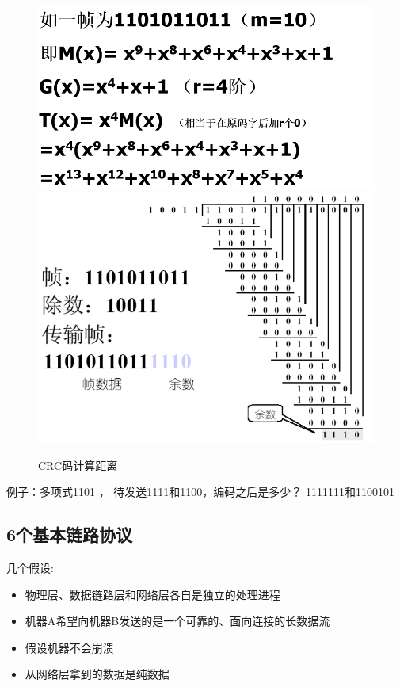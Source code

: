 \documentclass[UTF8,a4paper]{ctexart}
\begin{document}
  \begin{figure}[H]
    \centering
    \includegraphics[scale = 0.3]{assets/jisuanjiwangluo_64318.png}
    \includegraphics[scale = 0.3]{assets/jisuanjiwangluo_05982.png}
    \caption{CRC码计算距离}
  \end{figure}

  例子：多项式1101 ， 待发送1111和1100，编码之后是多少？
  1111111和1100101

  \subsection{6个基本链路协议}
  几个假设:
  \begin{itemize}
    \item 物理层、数据链路层和网络层各自是独立的处理进程
    \item 机器A希望向机器B发送的是一个可靠的、面向连接的长数据流
    \item 假设机器不会崩溃
    \item 从网络层拿到的数据是纯数据
  \end{itemize}
\end{document}
